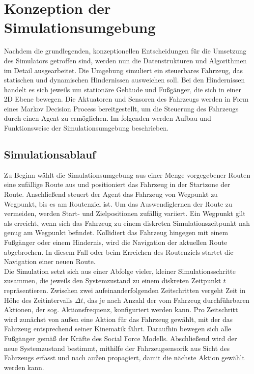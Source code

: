 
\section{Konzeption der Simulationsumgebung}\label{sec:SimEnv}
Nachdem die grundlegenden, konzeptionellen Entscheidungen für die Umsetzung des Simulators
getroffen sind, werden nun die Datenstrukturen und Algorithmen im Detail ausgearbeitet.
Die Umgebung simuliert ein steuerbares Fahrzeug, das statischen und dynamischen Hindernissen
ausweichen soll. Bei den Hindernissen handelt es sich jeweils um stationäre Gebäude
und Fußgänger, die sich in einer 2D Ebene bewegen.
Die Aktuatoren und Sensoren des Fahrzeugs werden in Form eines Markov Decision Process
bereitgestellt, um die Steuerung des Fahrzeugs durch einen Agent zu ermöglichen.
Im folgenden werden Aufbau und Funktionsweise der Simulationsumgebung beschrieben.

\subsection{Simulationsablauf}
Zu Beginn wählt die Simulationsumgebung aus einer Menge vorgegebener Routen
eine zufällige Route aus und positioniert das Fahrzeug in der Startzone der Route.
Anschließend steuert der Agent das Fahrzeug von Wegpunkt zu Wegpunkt, bis es am Routenziel ist.
Um das Auswendiglernen der Route zu vermeiden, werden Start- und Zielpositionen zufällig
variiert. Ein Wegpunkt gilt als erreicht, wenn sich das Fahrzeug zu einem diskreten
Simulationszeitpunkt nah genug am Wegpunkt befindet. Kollidiert das Fahrzeug hingegen
mit einem Fußgänger oder einem Hindernis, wird die Navigation der aktuellen Route
abgebrochen. In diesem Fall oder beim Erreichen des Routenziels startet die Navigation
einer neuen Route.\\

Die Simulation setzt sich aus einer Abfolge vieler, kleiner Simulationsschritte
zusammen, die jeweils den Systemzustand zu einem diskreten Zeitpunkt $t$ repräsentieren.
Zwischen zwei aufeinanderfolgenden Zeitschritten vergeht Zeit in Höhe des Zeitintervalls
$\Delta t$, das je nach Anzahl der vom Fahrzeug durchführbaren Aktionen, der sog.
Aktionsfrequenz, konfiguriert werden kann.
Pro Zeitschritt wird zunächst von außen eine Aktion für das Fahrzeug gewählt, mit der
das Fahrzeug entsprechend seiner Kinematik fährt. Daraufhin bewegen sich alle Fußgänger
gemäß der Kräfte des Social Force Modells. Abschließend wird der neue Systemzustand
bestimmt, mithilfe der Fahrzeugsensorik aus Sicht des Fahrzeugs erfasst und nach außen
propagiert, damit die nächste Aktion gewählt werden kann.

